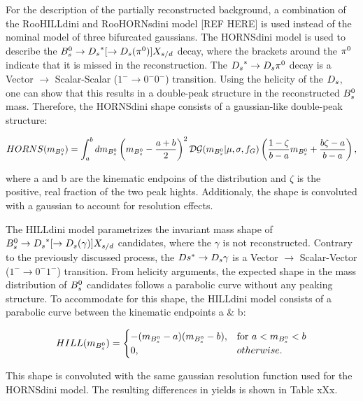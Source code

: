 For the description of the partially reconstructed background, 
a combination of the RooHILLdini and RooHORNsdini model [REF HERE] is used instead of the nominal model of three bifurcated gaussians. 
The HORNSdini model is used to describe the ${{B}^0_{s}}\rightarrow{\ensuremath{{D}_{s}}}^{*}[\rightarrow{\ensuremath{{D}_{s}}}({{\pi}^0})] X_{s/d}$ decay, where the brackets around the ${{\pi}^0}$ indicate that it is missed in the reconstruction. 
The ${{D}_{s}}^{*}\rightarrow{\ensuremath{{D}_{s}}}{\ensuremath{{\pi}^0}}$ decay is a Vector $\to$ Scalar-Scalar ($1^{-}\to 0^{-}0^{-}$) transition. 
Using the helicity of the ${{D}_{s}}$, one can show that this results in a double-peak structure in the reconstructed ${{B}^0_{s}}$ mass. 
Therefore, the HORNSdini shape consists of a gaussian-like double-peak structure:

\begin{equation}
HORNS(m_{{{B}^0_{s}}}) = \int^{b}_{a} dm_{{{B}^0_{s}}}\left(m_{{{B}^0_{s}}} - \frac{a+b}{2} \right)^{2}\mathcal{DG}(m_{{{B}^0_{s}}}\vert\mu,\sigma,f_{G})\left(\frac{1-\zeta}{b-a}m_{{{B}^0_{s}}} + \frac{b\zeta - a}{b - a} \right),
\label{eq:HORNS}
\end{equation}

where a and b are the kinematic endpoins of the distribution and $\zeta$ is the positive, real fraction of the two peak hights. Additionaly, the shape is convoluted with a gaussian to account for resolution effects.

The HILLdini model parametrizes the invariant mass shape of ${{B}^0_{s}}\rightarrow{\ensuremath{{D}_{s}}}^{*}[\rightarrow{\ensuremath{{D}_{s}}}(\gamma)] X_{s/d}$ candidates, where the $\gamma$ is not reconstructed.
Contrary to the previously discussed process, the $Ds^{*}\rightarrow{\ensuremath{{D}_{s}}}\gamma$ is a Vector $\to$ Scalar-Vector ($1^{-} \to 0^{-} 1^{-}$) transition. 
From helicity arguments, the expected shape in the mass distribution of ${{B}^0_{s}}$ candidates follows a parabolic curve without any peaking structure.
To accommodate for this shape, the HILLdini model consists of a parabolic curve between the kinematic endpoints a \& b: 


\begin{equation}
HILL(m_{{{B}^0_{s}}}) = \begin{cases} -(m_{{{B}^0_{s}}} - a)(m_{{{B}^0_{s}}} - b),& \mbox{for } a < m_{{{B}^0_{s}}} < b \\
 0, &  otherwise. \end{cases}
\label{eq:HILLS}
 \end{equation}

This shape is convoluted with the same gaussian resolution function used for the HORNSdini model.
The resulting differences in yields is shown in Table xXx. \newline


